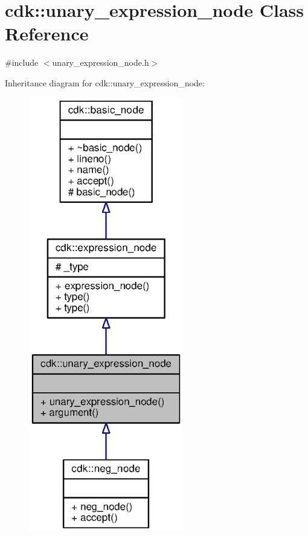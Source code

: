 \section{cdk\+:\+:unary\+\_\+expression\+\_\+node Class Reference}
\label{classcdk_1_1unary__expression__node}


{\ttfamily \#include $<$unary\+\_\+expression\+\_\+node.\+h$>$}



Inheritance diagram for cdk\+:\+:unary\+\_\+expression\+\_\+node\+:
\nopagebreak
\begin{figure}[H]
\begin{center}
\leavevmode
\includegraphics[width=191pt]{classcdk_1_1unary__expression__node__inherit__graph}
\end{center}
\end{figure}


